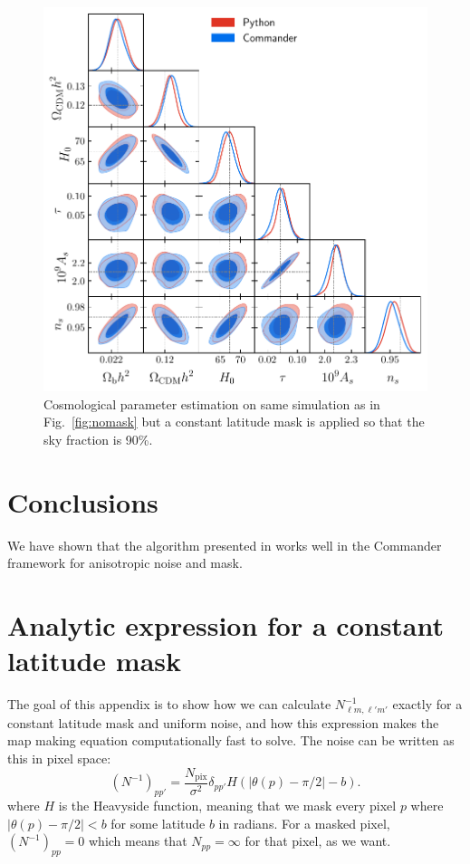 \documentclass[twocolumn]{../common/aa}
\begin{document}
\begin{figure}
	\centering
	\includegraphics[width=\linewidth]{figures/dist_posterior_10_mask.pdf}
	\caption{Cosmological parameter estimation on same simulation as in Fig.~\ref{fig:nomask} but a constant latitude mask is applied so that the sky fraction is 90\%.}
\end{figure}

\section{Conclusions}
\label{sec:conclusions}

We have shown that the algorithm presented in \cite{racine:2016} works well in the Commander framework for anisotropic noise and mask.





\appendix

\section{Analytic expression for a constant latitude mask}
\label{sec:appendix}


The goal of this appendix is to show how we can calculate $N_{\ell m, \ell' m'}^{-1}$ exactly for a constant latitude mask and uniform noise, and how this expression makes the map making equation computationally fast to solve. The noise can be written as this in pixel space:
$$
\left(N^{-1} \right)_{pp'} = \frac{N_{\mathrm{pix}}}{\sigma^2} \delta_{pp'} H(|\theta(p) -\pi/2|-b).
$$
where $H$ is the Heavyside function, meaning that we mask every pixel $p$ where $|\theta(p) -\pi/2| < b$ for some latitude $b$ in radians. For a masked pixel, $\left(N^{-1} \right)_{pp}=0$ which means that $N_{pp} = \infty$ for that pixel, as we want.
\end{document}
